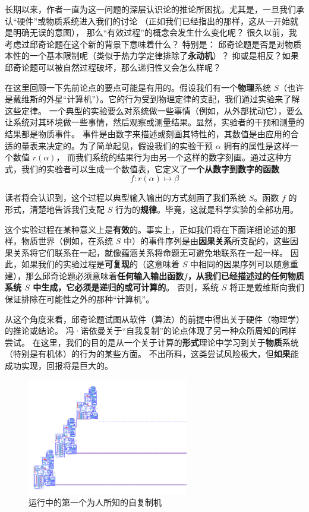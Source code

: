 \documentclass[a4paper,12pt]{article}
\begin{document}
长期以来，作者一直为这一问题的深层认识论的推论所困扰\cite{RosenR1962}。尤其是，一旦我们承认“硬件”或物质系统进入我们的讨论
（正如我们已经指出的那样，这从一开始就是明确无误的意图）， 那么“有效过程”的概念会发生什么变化呢？
很久以前\cite{RosenR1962}，我考虑过邱奇论题在这个新的背景下意味着什么？ 特别是：
邱奇论题是否是对物质本性的一个基本限制呢（类似于热力学定律排除了\textbf{永动机}）？
抑或是相反？如果邱奇论题可以被自然过程破坏，那么递归性又会怎么样呢？

在这里回顾一下先前论点的要点可能是有用的。假设我们有一个\textbf{物理}系统 $S$（也许是戴维斯的外星“计算机”）。它的行为受到物理定律的支配，我们通过实验来了解这些定律。
一个典型的实验要么对系统做一些事情（例如，从外部扰动它），要么让系统对其环境做一些事情，然后\gls{观察}或\gls{测量}结果。显然，实验者的干预和测量的结果都是\gls{物质事件}。
\gls{事件}是由数字来描述或刻画其特性的，其数值是由应用的合适的量表来决定的\cite{RosenR1978}。为了简单起见，假设我们的实验干预 $\alpha$ 拥有的属性是这样一个数值 $r(\alpha)$，
而我们系统的结果行为由另一个这样的数字刻画。通过这种方式，我们的实验者可以生成一个数值表，它定义了\textbf{一个从数字到数字的函数}  \begin{equation}\label{eq:1} f: r(\alpha) \mapsto \beta\end{equation}

读者将会认识到，这个过程以典型输入输出的方式刻画了我们系统 $S$。函数 $f$ 的形式，清楚地告诉我们支配 $S$ 行为的\textbf{规律}。毕竟，这就是\gls{科学实验}的全部功用。

这个实验过程在某种意义上是\textbf{有效}的。事实上，正如我们将在下面详细论述的那样，\gls{物质世界}（例如，在系统 $S$ 中）的\gls{事件序列}是由\textbf{\gls{因果关系}}所支配的，这些因果关系将它们联系在一起，就像\gls{蕴涵关系}将命题无可避免地联系在一起一样。
因此，如果我们的实验过程是\textbf{\gls{可复现}}的（这意味着 $S$ 中相同的\gls{因果序列}可以随意重建），那么邱奇论题必须意味着\textbf{任何输入输出函数\hyperref[eq:1]{$f$}，从我们已经描述过的任何物质系统 $S$ 中生成，它必须是递归的或\gls{可计算}的}。
否则，系统 $S$ 将正是戴维斯向我们保证排除在可能性之外的那种“计算机”。

从这个角度来看，邱奇论题试图从软件（算法）的前提中得出关于硬件（物理学）的推论或结论。
冯·诺依曼关于“自我复制”的论点\cite{BurksA1966}体现了另一种众所周知的同样尝试。
在这里，我们的目的是从一个关于计算的\textbf{形式}理论中学习到关于\textbf{物质}系统（特别是有机体）的行为的某些方面。
不出所料，这类尝试风险极大，但\textbf{如果}能成功实现，回报将是巨大的。

\begin{figure}[ht]
\centering
\includegraphics[height=2.0in]{images/self_reprod.png}
\caption{运行中的第一个为人所知的自复制机}
\end{figure}
\end{document}
